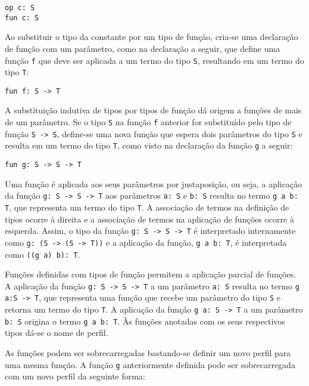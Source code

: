 \begin{Verbatim}
op c: S
fun c: S
\end{Verbatim}

Ao substituir o tipo da constante por um tipo de função, cria-se uma declaração de função com um parâmetro, como na declaração a seguir, que define uma função \Verb.f. que deve ser aplicada a um termo do tipo \Verb.S., resultando em um termo do tipo \Verb.T.:

\begin{Verbatim}
fun f: S -> T
\end{Verbatim}

A substituição indutiva de tipos por tipos de função dá origem a funções de mais de um parâmetro.
Se o tipo \Verb.S. na função \Verb.f. anterior for substituído pelo tipo de função \Verb.S -> S., define-se uma nova função que espera dois parâmetros do tipo \Verb.S. e resulta em um termo do tipo \Verb.T., como visto na declaração da função \Verb.g. a seguir:

\begin{Verbatim}
fun g: S -> S -> T
\end{Verbatim}

Uma função é aplicada aos seus parâmetros por justaposição, ou seja, a aplicação da função \Verb.g: S -> S -> T. aos parâmetros \Verb.a: S. e \Verb.b: S. resulta no termo \Verb.g a b: T., que representa um termo do tipo \Verb.T..
A associação de termos na definição de tipos ocorre à direita e a associação de termos na aplicação de funções ocorre à esquerda.
Assim, o tipo da função \Verb.g: S -> S -> T. é interpretado internamente como \Verb.g: (S -> (S -> T)). e a aplicação da função, \Verb.g a b: T., é interpretada como \Verb.((g a) b): T..

Funções definidas com tipos de função permitem a aplicação parcial de funções.
A aplicação da função \Verb.g: S -> S -> T. a um parâmetro \Verb.a: S. resulta no termo \Verb.g a:S -> T., que representa uma função que recebe um parâmetro do tipo \Verb.S. e retorna um termo do tipo \Verb.T..
A aplicação da função \Verb.g a: S -> T. a um parâmetro \Verb.b: S. origina o termo \Verb.g a b: T..
Às funções anotadas com os seus respectivos tipos dá-se o nome de perfil.

As funções podem ser sobrecarregadas bastando-se definir um novo perfil para uma mesma função.
A função \Verb.g. anteriormente definida pode ser sobrecarregada com um novo perfil da seguinte forma:

